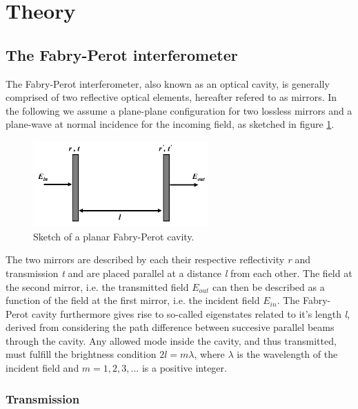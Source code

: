 \section{Theory}
\subsection{The Fabry-Perot interferometer}\label{sec:fabry_perot}

The Fabry-Perot interferometer, also known as an optical cavity, is generally comprised of two reflective optical elements, hereafter refered to as mirrors. In the following we assume a plane-plane configuration for two lossless mirrors and a plane-wave at normal incidence for the incoming field, as sketched in figure \ref{fig:planar_fabry-perot}. 

\begin{figure}[h!]
    \centering
    \includegraphics[width=0.6\textwidth]{figures/planar_fabry_perot.pdf}
    \caption{Sketch of a planar Fabry-Perot cavity.}
    \label{fig:planar_fabry-perot}
\end{figure}

The two mirrors are described by each their respective reflectivity \emph{r} and transmission \emph{t} and are placed parallel at a distance \emph{l} from each other. The field at the second mirror, i.e. the transmitted field $E_{out}$ can then be described as a function of the field at the first mirror, i.e. the incident field $E_{in}$. The Fabry-Perot cavity furthermore gives rise to so-called eigenstates related to it's length \emph{l}, derived from considering the path difference between succesive parallel beams through the cavity. Any allowed mode inside the cavity, and thus transmitted, must fulfill the brightness condition $2l = m \lambda$, where $\lambda$ is the wavelength of the incident field and $m=1,2,3,...$ is a positive integer.\cite{Eichhorn}\cite{Pedrotti}

\subsubsection{Transmission}

